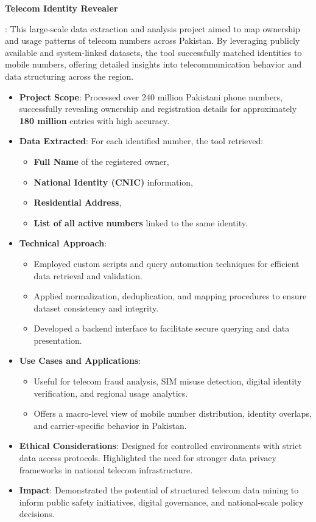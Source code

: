 \documentclass[letterpaper,10pt]{article}
\newcommand{\resumeItem}[2]{
  \item\small{
    \textbf{#1}{: #2 \vspace{-2pt}}
  }
}
\newcommand{\resumeSubItem}[2]{\resumeItem{#1}{#2}\vspace{-4pt}}
\begin{document}
\resumeSubItem{Telecom Identity Revealer}
{This large-scale data extraction and analysis project aimed to map ownership and usage patterns of telecom numbers across Pakistan. By leveraging publicly available and system-linked datasets, the tool successfully matched identities to mobile numbers, offering detailed insights into telecommunication behavior and data structuring across the region.
\begin{itemize}
    \item \textbf{Project Scope}: Processed over 240 million Pakistani phone numbers, successfully revealing ownership and registration details for approximately \textbf{180 million} entries with high accuracy.
    \item \textbf{Data Extracted}: For each identified number, the tool retrieved:
    \begin{itemize}
        \item \textbf{Full Name} of the registered owner,
        \item \textbf{National Identity (CNIC)} information,
        \item \textbf{Residential Address},
        \item \textbf{List of all active numbers} linked to the same identity.
    \end{itemize}
    \item \textbf{Technical Approach}:
    \begin{itemize}
        \item Employed custom scripts and query automation techniques for efficient data retrieval and validation.
        \item Applied normalization, deduplication, and mapping procedures to ensure dataset consistency and integrity.
        \item Developed a backend interface to facilitate secure querying and data presentation.
    \end{itemize}
    \item \textbf{Use Cases and Applications}:
    \begin{itemize}
        \item Useful for telecom fraud analysis, SIM misuse detection, digital identity verification, and regional usage analytics.
        \item Offers a macro-level view of mobile number distribution, identity overlaps, and carrier-specific behavior in Pakistan.
    \end{itemize}
    \item \textbf{Ethical Considerations}: Designed for controlled environments with strict data access protocols. Highlighted the need for stronger data privacy frameworks in national telecom infrastructure.
    \item \textbf{Impact}: Demonstrated the potential of structured telecom data mining to inform public safety initiatives, digital governance, and national-scale policy decisions.
\end{itemize}
}
\end{document}
